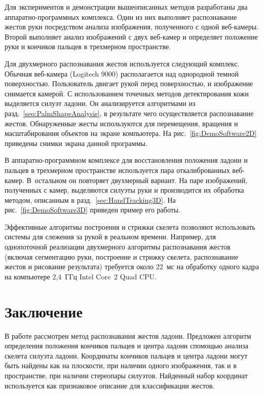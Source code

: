 \begin{multicols}{2}
Для экспериментов и демонстрации вышеописанных методов разработаны 
два ап\-па\-рат\-но-про\-грам\-мных комплекса.
Один из них выполняет распознавание жестов руки посредством анализа 
изображения, полученного с одной веб-ка\-ме\-ры.
Второй выполняет анализ изображений с двух веб-ка\-мер и определяет 
положение руки и кончиков пальцев в трехмерном пространстве.

Для двухмерного распознавания жестов используется следующий комплекс.
Обычная веб-ка\-ме\-ра (Logitech 9000) располагается над однородной темной по\-верх\-ностью.
Пользователь двигает рукой\linebreak
 перед поверхностью, и изображение снимается камерой.
С использованием точечных методов детектирования 
кожи~\cite{PixelBaseSkinSurveyGraphicon,SkinSegmentaionComparison} выделяется силуэт ладони.
Он анализируется алгоритмами из разд.~\ref{seq:PalmShapeAnalysis}, в результате чего 
осуществляется распознавание жес\-тов.
Обнаруженные жесты используются для перемещения, вращения и масштабирования 
объектов на экране компьютера.
На рис.~\ref{fig:DemoSoftware2D} приведены снимки экрана данной программы.



В аппаратно-программном комплексе для восстановления положения ладони 
и пальцев в трехмерном пространстве используется пара отка\-либ\-ро\-ван\-ных веб-ка\-мер.
В~остальном он повторяет двухмерный вариант.
На паре изображений, полученных с камер, выделяются силуэты руки и производится 
их обработка методом, описанным в разд.~\ref{sec:HandTracking3D}.
На рис.~\ref{fig:DemoSoftware3D} приведен пример его работы.


Эффективные алгоритмы построения и стрижки скелета позволяют использовать 
системы для слежения за рукой в реальном времени.
Например, для однопоточной реализации двухмерного алгоритмы распознавания жестов 
(включая сегментацию руки, построение и стрижку скелета, распознавание жестов и 
рисование результата) требуется около 22~мс на обработку одного кадра на компьютере 
2,4~ГГц Intel Core~2 Quad CPU.

\section{Заключение}\label{sec:Conclusion}

В работе рассмотрен метод распознавания жес\-тов ладони.
Предложен алгоритм определения положения кончиков пальцев 
и центра ладони с\linebreak помощью анализа скелета силуэта ладони.
Координаты кончиков пальцев и центра ладони могут быть 
найдены как на плоскости, при наличии одного изображения,
так и в пространстве, при наличии стереопары силуэтов.
Найденный набор координат используется как признаковое описание для классификации жестов.


\end{multicols}
